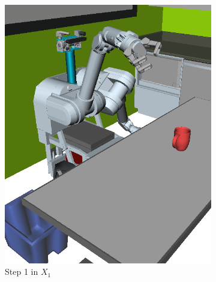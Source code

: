 {\begin{figure}
\begin{widepage}
\begin{center}
\begin{subfigure}[t]{0.19\linewidth}
\includegraphics[width=\columnwidth]{figs/testherb-b.png}
\caption{Step 1 in $X_1$}
\end{subfigure}
\begin{subfigure}[t]{0.19\linewidth}
\centering

\end{subfigure}
\end{center}
\end{widepage}
\end{figure}}
